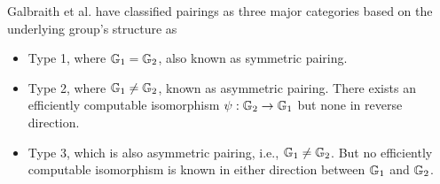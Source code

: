 Galbraith et al. \cite{galbraith2008pairings} have classified pairings as three major categories based on the underlying group's structure as 
\begin{itemize}
	\item Type 1, where ${\mathbb{G}}_{1} = {\mathbb{G}}_{2}$, also known as symmetric pairing. 
	\item Type 2, where ${\mathbb{G}}_{1} \neq {\mathbb{G}}_{2}$, known as asymmetric pairing. There exists an efficiently computable isomorphism $\psi : {\mathbb{G}}_{2} \to {\mathbb{G}}_{1}$ but none in reverse direction.
	\item Type 3, which is also asymmetric pairing, i.e., ${\mathbb{G}}_{1} \neq {\mathbb{G}}_{2}$. But no efficiently computable isomorphism is known in either direction  between ${\mathbb{G}}_{1}$ and ${\mathbb{G}}_{2}$.
\end{itemize}


%
